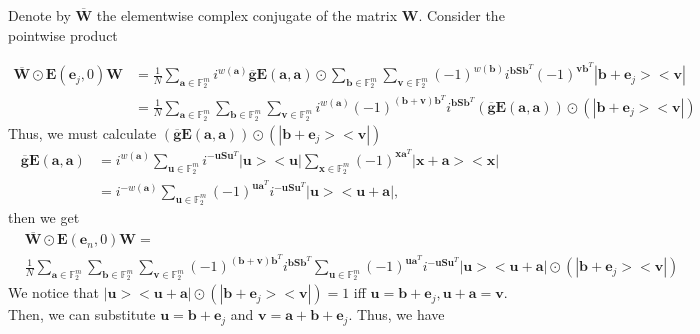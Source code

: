 \documentclass{article}
\begin{document}
\begin{enumerate}
	Denote by $\overline{\mathbf{W}}$ the elementwise complex conjugate of the matrix $\mathbf{W}$. Consider the pointwise product
	
	\begin{align*}
		\overline{\mathbf{W}} \odot \mathbf{E}(\mathbf{e}_j, 0)\mathbf{W}& = \frac{1}{N} \sum_{\mathbf{a} \in \mathbb{F}^m_2} i^{w(\mathbf{a})}\overline{\mathbf{g}}\mathbf{E}(\mathbf{a},\mathbf{a})\odot \sum_{\mathbf{b} \in \mathbb{F}_2^m}{\sum_{\mathbf{v} \in \mathbb{F}_2^m}{ (-1)^{w(\mathbf{b})} i^{\mathbf{b}\mathbf{S}\mathbf{b}^T}(-1)^{\mathbf{v}\mathbf{b}^T} |\mathbf{b}+\mathbf{e}_j><\mathbf{v}|}}\\
		&=\frac{1}{N} \sum_{\mathbf{a} \in \mathbb{F}^m_2}{\sum_{\mathbf{b} \in \mathbb{F}_2^m}{\sum_{\mathbf{v} \in \mathbb{F}_2^m}}i^{w(\mathbf{a})}(-1)^{(\mathbf{b+v})\mathbf{b}^T}  i^{\mathbf{b}\mathbf{S}\mathbf{b}^T} (\overline{\mathbf{g}}\mathbf{E}(\mathbf{a},\mathbf{a}))\odot (|\mathbf{b}+\mathbf{e}_j><\mathbf{v}|) }
	\end{align*}
	Thus, we must calculate $(\overline{\mathbf{g}}\mathbf{E}(\mathbf{a},\mathbf{a}))\odot (|\mathbf{b}+\mathbf{e}_j><\mathbf{v}|)$
	\begin{align*}
		\overline{\mathbf{g}}\mathbf{E}(\mathbf{a},\mathbf{a}) &=i^{w(\mathbf{a})} \sum_{\mathbf{u} \in \mathbb{F}_2^m}{i^{-\mathbf{u S}\mathbf{u}^T} |\mathbf{u}><\mathbf{u}|}\sum_{\mathbf{x} \in \mathbb{F}_2^m}{ (-1)^{\mathbf{x}\mathbf{a}^T}|\mathbf{x+a}><\mathbf{x}|} \\
		&=i^{-w(\mathbf{a})} \sum_{\mathbf{u} \in \mathbb{F}_2^m}{(-1)^{\mathbf{u}\mathbf{a}^T}i^{-\mathbf{u S}\mathbf{u}^T} |\mathbf{u}><\mathbf{u+a}|},
	\end{align*} 
	then we get
	\begin{align*}
		&\overline{\mathbf{W}} \odot \mathbf{E}(\mathbf{e}_n, 0)\mathbf{W} = \\
		& \frac{1}{N} \sum_{\mathbf{a} \in \mathbb{F}^m_2}{\sum_{\mathbf{b} \in \mathbb{F}_2^m}{\sum_{\mathbf{v} \in \mathbb{F}_2^m}}(-1)^{(\mathbf{b+v})\mathbf{b}^T}  i^{\mathbf{b}\mathbf{S}\mathbf{b}^T} \sum_{\mathbf{u} \in \mathbb{F}_2^m}{(-1)^{\mathbf{u}\mathbf{a}^T}i^{-\mathbf{u S}\mathbf{u}^T} |\mathbf{u}><\mathbf{u+a}|} \odot (|\mathbf{b}+\mathbf{e}_j><\mathbf{v}|) }
	\end{align*}
	We notice that $|\mathbf{u}><\mathbf{u+a}| \odot (|\mathbf{b}+\mathbf{e}_j><\mathbf{v}|) = 1$ iff $\mathbf{u}=\mathbf{b}+\mathbf{e}_j, \mathbf{u+a}=\mathbf{v}$. Then, we can substitute $\mathbf{u} = \mathbf{b}+\mathbf{e}_j$ and $\mathbf{v}=\mathbf{a}+\mathbf{b}+\mathbf{e}_j$. Thus, we have

\end{enumerate}
\end{document}
